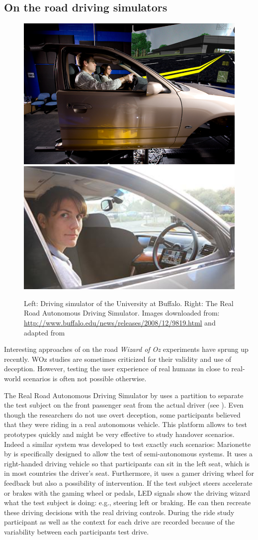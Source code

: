 \subsection{On the road driving simulators}\label{ssec:simulator}
\begin{figure}
    \includegraphics[height=0.3\textwidth]{fig/simulator}\hfill\includegraphics[height=0.3\textwidth]{fig/rrads}
    \caption[Driving simulators]{Left: Driving simulator of the University at Buffalo. 
   Right: The Real Road Autonomous Driving Simulator. Images downloaded from: \url{http://www.buffalo.edu/news/releases/2008/12/9819.html} and adapted from \citet{Baltodano2015}}
    \label{fig:simulators}
\end{figure}
Interesting approaches of on the road \emph{Wizard of Oz} experiments have sprung up recently.  WOz studies are sometimes criticized for their validity and use of deception\citep[see][]{Riek2012WizardGuidelines}. However, testing the user experience of real humans in close to real-world scenarios is often not possible otherwise. 

The Real Road Autonomous Driving Simulator by\citet{Baltodano2015} uses a partition to separate the test subject on the front passenger seat from the actual driver (see \emph{}). Even though the researchers do not use overt deception, some participants believed that they were riding in a real autonomous vehicle. This platform allows to test prototypes quickly and might be very effective to study handover scenarios. Indeed a similar system was developed to test exactly such scenarios: Marionette by \citet{Wang2017} is specifically designed to allow the test of semi-autonomous systems. It uses a right-handed driving vehicle so that participants can sit in the left seat, which is in most countries the driver's seat. Furthermore, it uses a gamer driving wheel for feedback but also a possibility of intervention. If the test subject steers accelerate or brakes with the gaming wheel or pedals, LED signals show the driving wizard what the test subject is doing: e.g., steering left or braking. He can then recreate these driving decisions with the real driving controls. During the ride study participant as well as the context for each drive are recorded because of the variability between each participants test drive. 

